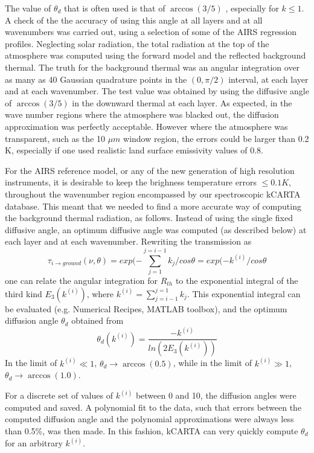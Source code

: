 \documentclass[11pt]{article}
\begin{document}
The value of $\theta_{d}$ that is often used is that of $\arccos(3/5)$ 
\cite{lio:80}, especially for $k \le 1$.  A check of the the accuracy of 
using this angle at all layers and at all wavenumbers was carried out, using 
a selection of some of the AIRS regression profiles. Neglecting
solar radiation, the total radiation at the top of the atmosphere was
computed using the forward model and the reflected background thermal.
The truth for the background thermal was an angular integration over as many
as 40 Gaussian quadrature points in the $(0,\pi/2)$ interval, at each layer 
and at each wavenumber. The test value was obtained by using the diffusive 
angle of $\arccos (3/5)$ in the downward thermal at each layer. As expected,
in the wave number regions where the atmosphere was blacked out, the
diffusion approximation was perfectly acceptable. However where the atmosphere
was transparent, such as the 10 $\mu m$ window region, the errors could be 
larger than 0.2 K, especially if one used realistic land surface emissivity 
values of 0.8.

For the \textsf{AIRS} reference model, or any of the new generation of high 
resolution instruments, it is desirable to keep the brighness temperature 
errors $\le 0.1K$, throughout the wavenumber region encompassed by our 
spectroscopic \textsf{kCARTA} database. This meant that we needed to find a 
more accurate way of computing the background thermal radiation, as follows.
Instead of using the single fixed diffusive angle, an optimum diffusive 
angle was computed (as described below) at each layer and at each wavenumber. 
Rewriting the transmission as 
\[
\tau_{i \rightarrow ground}(\nu,\theta) = 
exp(-\sum_{j=1}^{j=i-1}k_{j}/cos\theta = exp(-k^{(i)}/cos\theta
\]
one can relate the angular integration for $R_{th}$ to the exponential 
integral of the third kind $E_{3}(k^{(i)})$, where 
$k^{(i)} = \sum_{j=i-1}^{j=1}k_{j}$.  This exponential integral can be 
evaluated (e.g. Numerical Recipes, MATLAB toolbox), and the optimum 
diffusion angle $\theta_{d}$ obtained from
\begin{equation}
         \theta_{d}(k^{(i)}) = \frac{- k^{(i)}}{ln (2 E_{3}(k^{(i)}))}
\end{equation}
In the limit
of $k^{(i)} \ll 1$, $\theta_{d} \rightarrow \arccos(0.5)$, while in the limit
of $k^{(i)} \gg 1$, $\theta_{d} \rightarrow \arccos(1.0)$. 

For a discrete set of values of $k^{(i)}$ between 0 and 10, the
diffusion angles were computed and saved. A polynomial fit to the
data, such that errors between the computed diffusion angle and the
polynomial approximations were always less than 0.5\%, was then made.
In this fashion, \textsf{kCARTA} can very quickly compute $\theta_{d}$
for an arbitrary $k^{(i)}$.
\end{document}

